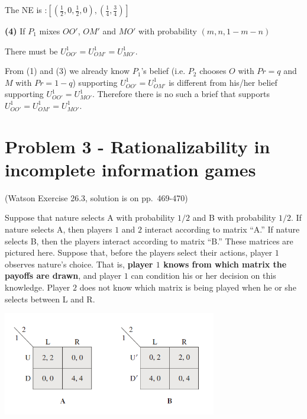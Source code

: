 \documentclass{article}
\begin{document}
The NE is :$[\left( \tfrac12, 0, \tfrac12, 0 \right), \left( \tfrac14, \tfrac34 \right)]$

\medskip

\textbf{(4)} If $P_1$ mixes $OO'$, $OM'$ and $MO'$ with probability $(m,n,1-m-n)$
\medskip

There must be $U^1_{OO'} = U^1_{OM'} = U^1_{MO'}$.

From (1) and (3) we already know 
$P_1$'s belief (i.e. $P_2$ chooses $O$ with $Pr=q$ and $M$ with $Pr=1-q$) 
supporting $U^1_{OO'} = U^1_{OM'}$ is different from his/her belief supporting
$U^1_{OO'} = U^1_{MO'}$. Therefore there is no such a brief that supports
$U^1_{OO'} = U^1_{OM'} = U^1_{MO'}$.


\newpage

\section{Problem 3 - Rationalizability in incomplete information games}

(Watson Exercise 26.3, solution is on pp.~469-470)

Suppose that nature selects A with probability $1/2$ and B with probability
$1/2$. If nature selects A, then players $1$ and $2$ interact according to matrix
``A.'' If nature selects B, then the players interact according to matrix ``B.''
These matrices are pictured here. Suppose that, before the players select
their actions, player $1$ observes nature's choice. That is, \textbf{player $1$ knows
from which matrix the payoffs are drawn}, and player $1$ can condition his
or her decision on this knowledge. Player $2$ does not know which matrix is
being played when he or she selects between L and R.

\begin{center}
\includegraphics[width=0.7\textwidth]{9.q26_3}
\end{center}
\vspace{2mm}
\end{document}
